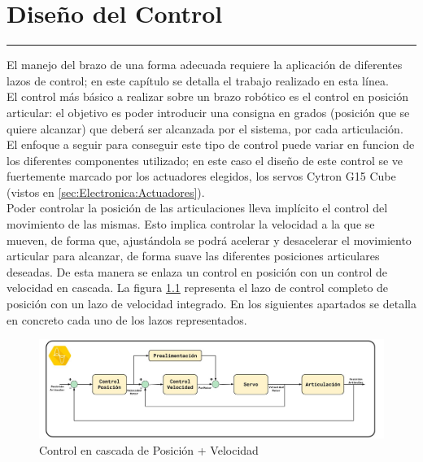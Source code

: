 \chapter{Diseño del Control} \label{chap:Control}
\hrule
\vspace{3mm}

El manejo del brazo de una forma adecuada requiere la aplicación de diferentes lazos de control; en este capítulo se detalla el trabajo realizado en esta línea.
\\

El control más básico a realizar sobre un brazo robótico es el control en posición articular: el objetivo es poder introducir una consigna en grados (posición que se quiere alcanzar) que deberá ser alcanzada por el sistema, por cada articulación. El enfoque a seguir para conseguir este tipo de control puede variar en funcion de los diferentes componentes utilizado; en este caso el diseño de este control se ve fuertemente marcado por los actuadores elegidos, los servos Cytron G15 Cube (vistos en \ref{sec:Electronica:Actuadores}).
\\

Poder controlar la posición de las articulaciones lleva implícito el control del movimiento de las mismas. Esto implica controlar la velocidad a la que se mueven, de forma que, ajustándola se podrá acelerar y desacelerar el movimiento articular para alcanzar, de forma suave las diferentes posiciones articulares deseadas. De esta manera se enlaza un control en posición con un control de velocidad en cascada. La figura \ref{fig:Control:control_cascada} representa el lazo de control completo de posición con un lazo de velocidad integrado. En los siguientes apartados se detalla en concreto cada uno de los lazos representados.


\begin{figure}[H]
    \centering
    \includegraphics[width=1\textwidth]{figuras/Imagenes_Control/control_cascada.jpg}
    \caption{Control en cascada de Posición + Velocidad}
    \label{fig:Control:control_cascada}
\end{figure}

